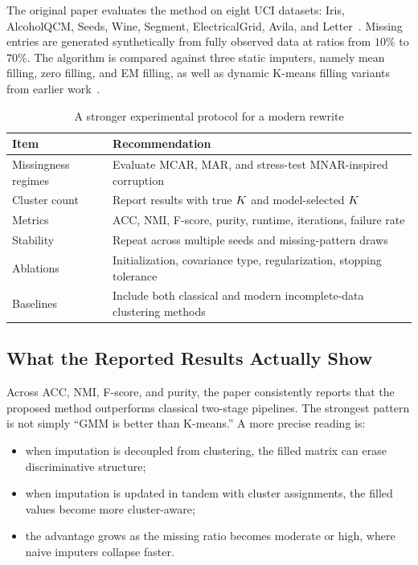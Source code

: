 The original paper evaluates the method on eight UCI datasets: Iris, AlcoholQCM, Seeds, Wine, Segment, ElectricalGrid, Avila, and Letter~\cite{zhang2021gmm}. Missing entries are generated synthetically from fully observed data at ratios from $10\%$ to $70\%$. The algorithm is compared against three static imputers, namely mean filling, zero filling, and EM filling, as well as dynamic K-means filling variants from earlier work~\cite{wang2019kmeans}.

\begin{table}[t]
    \caption{A stronger experimental protocol for a modern rewrite}
    \label{tab:protocol}
    \centering
    \begin{tabularx}{\linewidth}{@{}lX@{}}
        \toprule
        Item & Recommendation \\
        \midrule
        Missingness regimes & Evaluate MCAR, MAR, and stress-test MNAR-inspired corruption \\
        Cluster count & Report results with true $K$ and model-selected $K$ \\
        Metrics & ACC, NMI, F-score, purity, runtime, iterations, failure rate \\
        Stability & Repeat across multiple seeds and missing-pattern draws \\
        Ablations & Initialization, covariance type, regularization, stopping tolerance \\
        Baselines & Include both classical and modern incomplete-data clustering methods \\
        \bottomrule
    \end{tabularx}
\end{table}

\subsection{What the Reported Results Actually Show}
Across ACC, NMI, F-score, and purity, the paper consistently reports that the proposed method outperforms classical two-stage pipelines. The strongest pattern is not simply ``GMM is better than K-means.'' A more precise reading is:
\begin{itemize}
    \item when imputation is decoupled from clustering, the filled matrix can erase discriminative structure;
    \item when imputation is updated in tandem with cluster assignments, the filled values become more cluster-aware;
    \item the advantage grows as the missing ratio becomes moderate or high, where naive imputers collapse faster.
\end{itemize}

